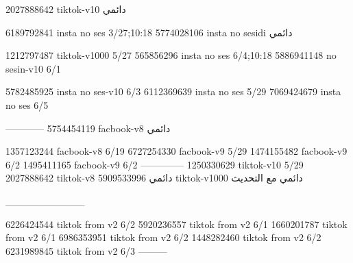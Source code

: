 2027888642 tiktok-v10
دائمي

6189792841 insta no ses
3/27;10:18
5774028106 insta no sesidi
دائمي

1212797487 tiktok-v1000
5/27
565856296 insta no ses
6/4;10:18
5886941148 no sesin-v10
6/1

5782485925 insta no ses-v10
6/3
6112369639 insta no ses
5/29
7069424679 insta no ses
6/5

------------
5754454119 facbook-v8
دائمي

1357123244 facbook-v8
6/19
6727254330 facbook-v9
5/29
1474155482 facbook-v9
6/2
1495411165 facbook-v9
6/2
--------------
1250330629 tiktok-v10
5/29
2027888642 tiktok-v8
دائمي
5909533996 tiktok-v1000
دائمي مع التحديث

___________

6226424544 tiktok from v2
6/2
5920236557 tiktok from v2
6/1
1660201787 tiktok from v2
6/1
6986353951 tiktok from v2
6/2
1448282460 tiktok from v2
6/2
6231989845 tiktok from v2
6/3
---------
